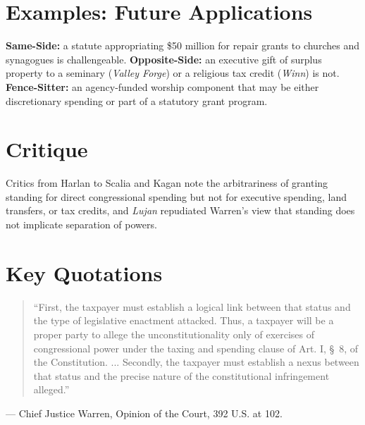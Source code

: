 \documentclass[12pt]{article}
\begin{document}
\section{Examples: Future Applications}
\textbf{Same-Side:} a statute appropriating \$50 million for repair grants to churches and synagogues is challengeable. \textbf{Opposite-Side:} an executive gift of surplus property to a seminary (\textit{Valley Forge}) or a religious tax credit (\textit{Winn}) is not. \textbf{Fence-Sitter:} an agency-funded worship component that may be either discretionary spending or part of a statutory grant program.

\section{Critique}
Critics from Harlan to Scalia and Kagan note the arbitrariness of granting standing for direct congressional spending but not for executive spending, land transfers, or tax credits, and \textit{Lujan} repudiated Warren's view that standing does not implicate separation of powers.

\section{Key Quotations}
\begin{quote}
``First, the taxpayer must establish a logical link between that status and the type of legislative enactment attacked. Thus, a taxpayer will be a proper party to allege the unconstitutionality only of exercises of congressional power under the taxing and spending clause of Art. I, \S\ 8, of the Constitution. ... Secondly, the taxpayer must establish a nexus between that status and the precise nature of the constitutional infringement alleged.''
\end{quote}
\noindent --- Chief Justice Warren, Opinion of the Court, 392 U.S. at 102.
\end{document}
